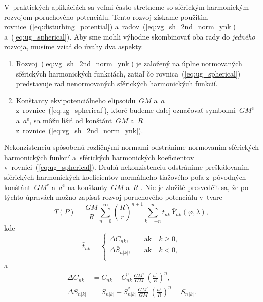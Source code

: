 \documentclass[a4paper, 12pt]{book}
\begin{document}
V~praktických aplikáciách sa veľmi často stretneme so sférickým harmonickým 
rozvojom poruchového potenciálu.  Tento rozvoj získame použitím 
rovnice~(\ref{eq:disturbing_potential}) a~radov~(\ref{eq:vg_sh_2nd_norm_ynk}) 
a~(\ref{eq:ug_spherical}).  Aby sme mohli výhodne skombinovať oba rady do 
\emph{jedného} rozvoja, musíme vziať do úvahy dva aspekty.  
%
\begin{enumerate}
\item Rozvoj~(\ref{eq:vg_sh_2nd_norm_ynk}) je založený na úplne normovaných 
sférických harmonických funkciách, zatiaľ čo rovnica~(\ref{eq:ug_spherical}) 
predstavuje rad nenormovaných sférických harmonických funkcií.
%
\item Konštanty ekvipotenciálneho elipsoidu~$GM$ a~$a$ 
z~rovnice~(\ref{eq:ug_spherical}), ktoré budeme ďalej označovať 
symbolmi~$GM^\mathrm{e}$ a~$a^\mathrm{e}$, sa môžu líšiť od konštánt~$GM$ a~$R$ 
z~rovnice~(\ref{eq:vg_sh_2nd_norm_ynk}).
\end{enumerate}
%
Nekonzistenciu spôsobenú rozličnými normami odstránime normovaním sférických 
harmonických funkcií a~sférických harmonických koeficientov 
v~rovnici~(\ref{eq:ug_spherical}).  Druhú nekonzistenciu odstránime 
preškálovaním sférických harmonických koeficientov normálneho tiažového poľa 
z~pôvodných konštánt~$GM^\mathrm{e}$ a~$a^\mathrm{e}$ na konštanty~$GM$ a~$R$ 
\parencite[pozri napríklad][]{Barthelmes2013}.  Nie je zložité presvedčiť sa, 
že po týchto úpravách možno zapísať rozvoj poruchového potenciálu v~tvare
%
\begin{equation}
\label{eq:t_sh}
T(P) = \frac{GM}{R} \sum_{n = 0}^\infty \left( \frac{R}{r} \right)^{n
+ 1} \sum_{k = -n}^{n} \bar{t}_{nk} \, \bar{Y}_{nk}(\varphi, \lambda){,}
\end{equation}
%
kde
%
\begin{equation}
\label{eq:t_shc}
\bar{t}_{nk} =
%
\begin{cases}
\Delta \bar{C}_{nk}{,}   \quad &\textrm{ak} \quad k \geq 0{,}\\
\Delta \bar{S}_{n|k|}{,} \quad &\textrm{ak} \quad k < 0{,}\\
\end{cases}
\end{equation}
%
a
%
\begin{equation}
\label{eq:cell_sell}
\begin{split}
\Delta \bar{C}_{nk} &= \bar{C}_{nk} - \bar{C}_{nk}^\mathrm{e} \, 
\frac{GM^\mathrm{e}}{GM} \, \left( \frac{a^\mathrm{e}}{R} \right)^n{,}\\
\Delta \bar{S}_{n|k|} &= \bar{S}_{n|k|} - \bar{S}_{n|k|}^\mathrm{e} \, 
\frac{GM^\mathrm{e}}{GM} \, \left( \frac{a^\mathrm{e}}{R} \right)^n 
= \bar{S}_{n|k|}{.}
\end{split}
\end{equation}
\end{document}
